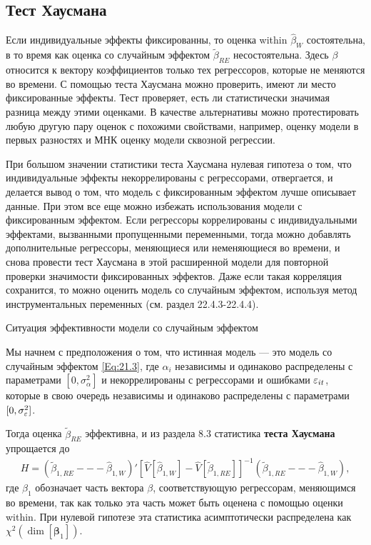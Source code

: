 \subsection{Тест Хаусмана}

Если индивидуальные эффекты фиксированны, то оценка within $\hat{\beta}_W$ состоятельна, в то время как оценка со случайным эффектом $\tilde{\beta}_{RE}$ несостоятельна. Здесь $\beta$ относится к вектору коэффициентов только тех регрессоров, которые не меняются во времени. С помощью теста Хаусмана можно проверить, имеют ли место фиксированные эффекты. Тест проверяет, есть ли статистически значимая разница между этими оценками. В качестве альтернативы можно протестировать любую другую пару оценок с похожими свойствами, например, оценку модели в первых разностях и МНК оценку модели сквозной регрессии.

При большом значении статистики теста Хаусмана нулевая гипотеза о том, что индивидуальные эффекты некоррелированы с регрессорами, отвергается, и делается вывод о том, что модель с фиксированным эффектом лучше описывает данные. При этом все еще можно избежать использования модели с фиксированным эффектом. Если регрессоры коррелированы с индивидуальными эффектами, вызванными пропущенными переменными, тогда можно добавлять дополнительные регрессоры, меняющиеся или неменяющиеся во времени, и снова провести тест Хаусмана в этой расширенной модели для повторной проверки значимости фиксированных эффектов. Даже если такая корреляция сохранится, то можно оценить модель со случайным эффектом, используя метод инструментальных переменных (см. раздел 22.4.3-22.4.4). 

{\centering
Ситуация эффективности модели со  случайным эффектом\\}

Мы начнем с предположения о том, что истинная модель  --- это модель со случайным эффектом \ref{Eq:21.3}, где $\alpha_i$ независимы и одинаково распределены с параметрами $[0,\sigma^2_{\alpha}]$ и некоррелированы с регрессорами и ошибками $\varepsilon_{it}$, которые в свою очередь независимы и одинаково распределены с параметрами $[0,\sigma^2_{\varepsilon}]$.

Тогда оценка $\tilde{\beta}_{RE}$ эффективна, и из раздела 8.3 статистика \textbf{теста Хаусмана} упрощается до
\begin{align}
H=\left(\tilde{\beta}_{1,RE} --- \hat{\beta}_{1,W}\right)' \left[\hat{V}[\hat{\beta}_{1,W}]-\hat{V}[\tilde{\beta}_{1,RE}]\right]^{-1} \left(\tilde{\beta}_{1,RE} --- \hat{\beta}_{1,W}\right),
\nonumber
\end{align}
где $\beta_1$ обозначает часть вектора $\beta$, соответствующую регрессорам, меняющимся во времени, так как только эта часть может быть оценена с помощью оценки within. При нулевой гипотезе эта статистика асимптотически распределена как $\chi^2(\dim[\bm\beta_1])$.

